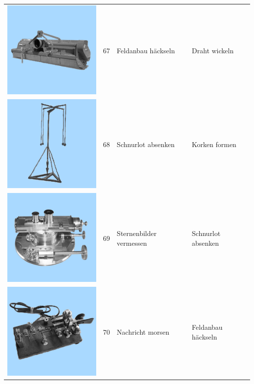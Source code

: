 \documentclass[
  english,
  doc,12pt,twoside,floatsintext]{apa7}
\begin{document}
\begin{center}
\begin{ThreePartTable}
\begin{longtable}{llll}
\includegraphics[valign=c, scale=0.19]{../materials/unfamiliar/67.png} & 67 & Feldanbau häckseln & Draht wickeln\\
\includegraphics[valign=c, scale=0.19]{../materials/unfamiliar/68.png} & 68 & Schnurlot absenken & Korken formen\\
\includegraphics[valign=c, scale=0.19]{../materials/unfamiliar/69.png} & 69 & Sternenbilder vermessen & Schnurlot absenken\\
\includegraphics[valign=c, scale=0.19]{../materials/unfamiliar/70.png} & 70 & Nachricht morsen & Feldanbau häckseln\\

\end{longtable}
\end{ThreePartTable}
\end{center}
\end{document}
